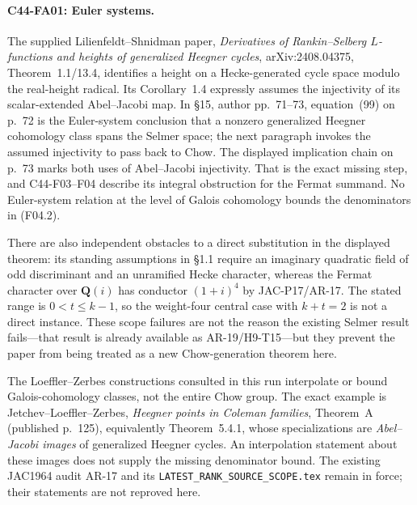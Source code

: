 \documentclass[11pt]{article}
\theoremstyle{remark}\newtheorem{remark}[theorem]{Remark}
\begin{document}
\paragraph{C44-FA01: Euler systems.}
The supplied Lilienfeldt--Shnidman paper,
\emph{Derivatives of Rankin--Selberg $L$-functions and heights of
generalized Heegner cycles}, arXiv:2408.04375,
Theorem~1.1/13.4, identifies a height on a Hecke-generated cycle
space modulo the real-height radical.  Its Corollary~1.4 expressly
assumes the injectivity of its scalar-extended Abel--Jacobi map.
In \S15, author pp.~71--73, equation~(99) on p.~72 is the Euler-system
conclusion that a nonzero generalized Heegner cohomology class
spans the Selmer space; the next paragraph invokes the assumed
injectivity to pass back to Chow.  The displayed implication chain
on p.~73 marks both uses of Abel--Jacobi injectivity.  That is the exact missing
step, and C44-F03--F04 describe its integral obstruction for the
Fermat summand.  No Euler-system relation at the level of
Galois cohomology bounds the denominators in (F04.2).

There are also independent obstacles to a direct substitution
in the displayed theorem: its standing assumptions in \S1.1
require an imaginary quadratic field of odd discriminant and
an unramified Hecke character, whereas the Fermat character
over $\mathbf Q(i)$ has conductor $(1+i)^4$ by JAC-P17/AR-17.
The stated range is $0<t\le k-1$, so the weight-four central
case with $k+t=2$ is not a direct instance.  These scope failures
are not the reason the existing Selmer result fails---that result
is already available as AR-19/H9-T15---but they prevent the paper
from being treated as a new Chow-generation theorem here.

The Loeffler--Zerbes constructions consulted in this run
interpolate or bound Galois-cohomology classes, not the entire
Chow group.  The exact example is Jetchev--Loeffler--Zerbes,
\emph{Heegner points in Coleman families}, Theorem~A
(published p.~125), equivalently Theorem~5.4.1, whose
specializations are \emph{Abel--Jacobi images} of generalized
Heegner cycles.  An interpolation statement about these images
does not supply the missing denominator bound.  The existing
JAC1964 audit AR-17 and its
\texttt{LATEST\_RANK\_SOURCE\_SCOPE.tex} remain in force; their
statements are not reproved here.
\end{document}
